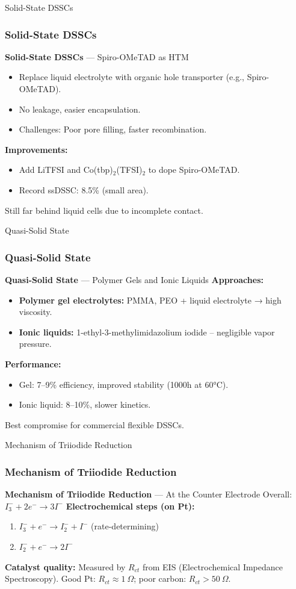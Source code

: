 \documentclass[aspectratio=169]{beamer}
\begin{document}
\begin{frame}{Solid-State DSSCs}
\frametitle{Solid-State DSSCs}

\textbf{Solid-State DSSCs} — Spiro-OMeTAD as HTM
\begin{itemize}
\item Replace liquid electrolyte with organic hole transporter (e.g., Spiro-OMeTAD).
\item No leakage, easier encapsulation.
\item Challenges: Poor pore filling, faster recombination.
\end{itemize}
\textbf{Improvements:}
\begin{itemize}
\item Add LiTFSI and Co(tbp)$_2$(TFSI)$_2$ to dope Spiro-OMeTAD.
\item Record ssDSSC: 8.5\% (small area).
\end{itemize}
Still far behind liquid cells due to incomplete contact.
\cite{Bach1998}
\end{frame}


\begin{frame}{Quasi-Solid State}
\frametitle{Quasi-Solid State}

\textbf{Quasi-Solid State} — Polymer Gels and Ionic Liquids
\textbf{Approaches:}
\begin{itemize}
\item \textbf{Polymer gel electrolytes:} PMMA, PEO + liquid electrolyte → high viscosity.
\item \textbf{Ionic liquids:} 1-ethyl-3-methylimidazolium iodide – negligible vapor pressure.
\end{itemize}
\textbf{Performance:}
\begin{itemize}
\item Gel: 7–9\% efficiency, improved stability (1000h at 60°C).
\item Ionic liquid: 8–10\%, slower kinetics.
\end{itemize}
Best compromise for commercial flexible DSSCs.
\cite{Wang2003}
\end{frame}


\begin{frame}{Mechanism of Triiodide Reduction}
\frametitle{Mechanism of Triiodide Reduction}

\textbf{Mechanism of Triiodide Reduction} — At the Counter Electrode
Overall: $I_3^- + 2e^- \rightarrow 3I^-$
\vspace{2mm}
\textbf{Electrochemical steps (on Pt):}
\begin{enumerate}
\item $I_3^- + e^- \rightarrow I_2^- + I^-$ (rate-determining)
\item $I_2^- + e^- \rightarrow 2I^-$
\end{enumerate}
\textbf{Catalyst quality:} Measured by $R_{ct}$ from EIS (Electrochemical Impedance Spectroscopy).
\vspace{2mm}
Good Pt: $R_{ct} \approx 1\ \Omega$; poor carbon: $R_{ct} > 50\ \Omega$.
\cite{Hauch2001}
\end{frame}
\end{document}
